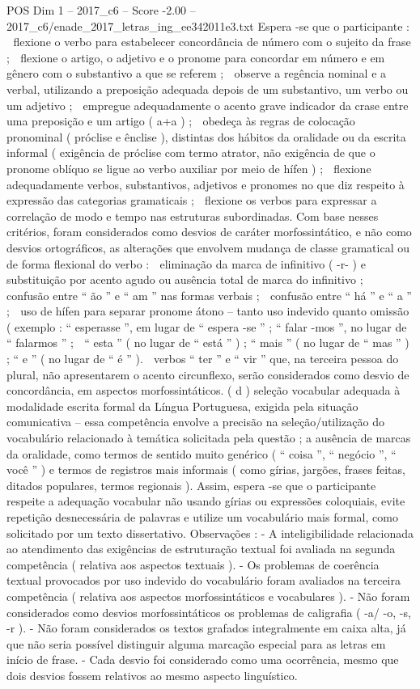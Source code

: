 \begin{textsample}{POS Dim 1 – 2017\_c6 – Score -2.00 – 2017\_c6/enade\_2017\_letras\_ing\_ee342011e3.txt}
Espera -se que o participante :  flexione o verbo para estabelecer concordância de número com o sujeito da frase ;  flexione o artigo, o adjetivo e o pronome para concordar em número e em gênero com o substantivo a que se referem ;  observe a regência nominal e a verbal, utilizando a preposição adequada depois de um substantivo, um verbo ou um adjetivo ;  empregue adequadamente o acento grave indicador da crase entre uma preposição e um artigo ( a+a ) ;  obedeça às regras de colocação pronominal ( próclise e ênclise ), distintas dos hábitos da oralidade ou da escrita informal ( exigência de próclise com termo atrator, não exigência de que o pronome oblíquo se ligue ao verbo auxiliar por meio de hífen ) ;  flexione adequadamente verbos, substantivos, adjetivos e pronomes no que diz respeito à expressão das categorias gramaticais ;  flexione os verbos para expressar a correlação de modo e tempo nas estruturas subordinadas.
Com base nesses critérios, foram considerados como desvios de caráter morfossintático, e não como desvios ortográficos, as alterações que envolvem mudança de classe gramatical ou de forma flexional do verbo :  eliminação da marca de infinitivo ( -r- ) e substituição por acento agudo ou ausência total de marca do infinitivo ;  confusão entre “ ão ” e “ am ” nas formas verbais ;  confusão entre “ há ” e “ a ” ;  uso de hífen para separar pronome átono – tanto uso indevido quanto omissão ( exemplo : “ esperasse ”, em lugar de “ espera -se ” ; “ falar -mos ”, no lugar de “ falarmos ” ;  “ esta ” ( no lugar de “ está ” ) ; “ mais ” ( no lugar de “ mas ” ) ; “ e ” ( no lugar de “ é ” ).  verbos “ ter ” e “ vir ” que, na terceira pessoa do plural, não apresentarem o acento circunflexo, serão considerados como desvio de concordância, em aspectos morfossintáticos. ( d ) seleção vocabular adequada à modalidade escrita formal da Língua Portuguesa, exigida pela situação comunicativa – essa competência envolve a precisão na seleção/utilização do vocabulário relacionado à temática solicitada pela questão ; a ausência de marcas da oralidade, como termos de sentido muito genérico ( “ coisa ”, “ negócio ”, “ você ” ) e termos de registros mais informais ( como gírias, jargões, frases feitas, ditados populares, termos regionais ).
Assim, espera -se que o participante respeite a adequação vocabular não usando gírias ou expressões coloquiais, evite repetição desnecessária de palavras e utilize um vocabulário mais formal, como solicitado por um texto dissertativo.
Observações : - A inteligibilidade relacionada ao atendimento das exigências de estruturação textual foi avaliada na segunda competência ( relativa aos aspectos textuais ). - Os problemas de coerência textual provocados por uso indevido do vocabulário foram avaliados na terceira competência ( relativa aos aspectos morfossintáticos e vocabulares ). - Não foram considerados como desvios morfossintáticos os problemas de caligrafia ( -a/ -o, -s, -r ). - Não foram considerados os textos grafados integralmente em caixa alta, já que não seria possível distinguir alguma marcação especial para as letras em início de frase. - Cada desvio foi considerado como uma ocorrência, mesmo que dois desvios fossem relativos ao mesmo aspecto linguístico.

\end{textsample}
